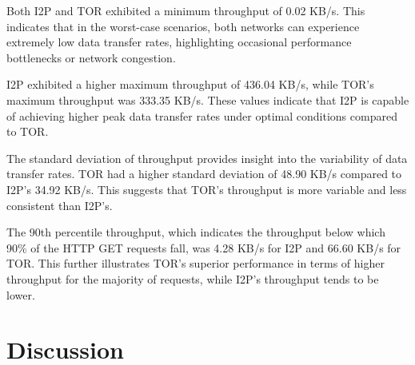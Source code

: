 \documentclass[12pt,conference]{IEEEtran}
\begin{document}
Both I2P and TOR exhibited a minimum throughput of 0.02 KB/s. This indicates that in the worst-case scenarios, both networks can experience extremely low data transfer rates, highlighting occasional performance bottlenecks or network congestion.

I2P exhibited a higher maximum throughput of 436.04 KB/s, while TOR's maximum throughput was 333.35 KB/s. These values indicate that I2P is capable of achieving higher peak data transfer rates under optimal conditions compared to TOR.

The standard deviation of throughput provides insight into the variability of data transfer rates. TOR had a higher standard deviation of 48.90 KB/s compared to I2P's 34.92 KB/s. This suggests that TOR's throughput is more variable and less consistent than I2P's.

The 90th percentile throughput, which indicates the throughput below which 90\% of the HTTP GET requests fall, was 4.28 KB/s for I2P and 66.60 KB/s for TOR. This further illustrates TOR's superior performance in terms of higher throughput for the majority of requests, while I2P's throughput tends to be lower.
\section{Discussion}



\end{document}
